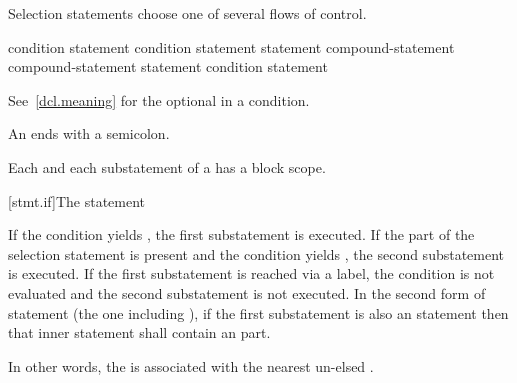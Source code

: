 \pnum
Selection statements choose one of several flows of control.

%
%
%
\begin{bnf}
\br
      \terminal{(}  condition \terminal{)} statement\br
      \terminal{(}  condition \terminal{)} statement  statement\br
     \opt{\terminal{!}}  compound-statement\br
     \opt{\terminal{!}}  compound-statement  statement\br
     \terminal{(}  condition \terminal{)} statement
\end{bnf}

See~\ref{dcl.meaning} for the optional  in a condition.
\begin{note}
An  ends with a semicolon.
\end{note}

\pnum
{}%
\begin{note}
Each  and
each substatement of a 
has a block scope.
\end{note}

[stmt.if]{The  statement}%

\pnum
If the condition yields , the first
substatement is executed. If the  part of the selection
statement is present and the condition yields , the second
substatement is executed. If the first substatement is reached via a
label, the condition is not evaluated and the second substatement is
not executed. In the second form of  statement
(the one including ), if the first substatement is also an
 statement then that inner  statement shall contain
an  part.
\begin{footnote}
In other words, the  is associated with the nearest un-elsed
.
\end{footnote}

